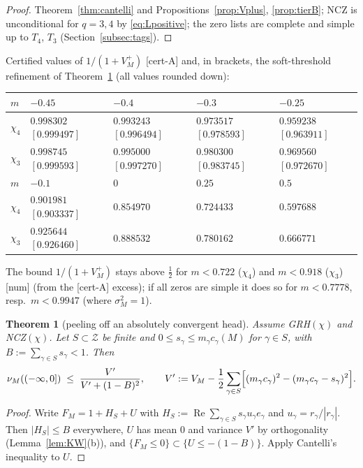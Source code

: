 \documentclass[11pt]{amsart}
\newtheorem{theorem}{Theorem}[section]
\theoremstyle{definition}
\numberwithin{equation}{section}
\newcommand{\re}{\operatorname{Re}}
\newcommand{\cZ}{\mathcal Z}          %
\newcommand{\certA}{\textsf{[cert-A]}}
\newcommand{\numtag}{\textsf{[num]}}
\begin{document}
\begin{proof}
Theorem~\ref{thm:cantelli} and
Propositions~\ref{prop:Vplus}, \ref{prop:tierB}; NCZ is unconditional
for $q=3,4$ by \eqref{eq:Lpositive}; the zero lists are complete and
simple up to $T_4$, $T_3$ (Section~\ref{subsec:tags}).
\end{proof}

Certified values of $1/(1+V_M^+)$ \certA{} and, in brackets, the
soft-threshold refinement of Theorem~\ref{thm:peel} (all values
rounded down):

\begin{center}
\small
\begin{tabular}{lllll}
\toprule
$m$ & $-0.45$ & $-0.4$ & $-0.3$ & $-0.25$\\
\midrule
$\chi_4$ & $0.998302$ $[0.999497]$ & $0.993243$ $[0.996494]$ &
$0.973517$ $[0.978593]$ & $0.959238$ $[0.963911]$\\
$\chi_3$ & $0.998745$ $[0.999593]$ & $0.995000$ $[0.997270]$ &
$0.980300$ $[0.983745]$ & $0.969560$ $[0.972670]$\\
\midrule
$m$ & $-0.1$ & $0$ & $0.25$ & $0.5$\\
\midrule
$\chi_4$ & $0.901981$ $[0.903337]$ & $0.854970$ & $0.724433$ &
$0.597688$\\
$\chi_3$ & $0.925644$ $[0.926460]$ & $0.888532$ & $0.780162$ &
$0.666771$\\
\bottomrule
\end{tabular}
\end{center}

\noindent The bound $1/(1+V_M^+)$ stays above $\tfrac12$ for
$m<0.722$ ($\chi_4$) and $m<0.918$ ($\chi_3$) \numtag{} (from the
\certA{} excess); if all zeros are simple it does so for $m<0.7778$,
resp.\ $m<0.9947$ (where $\sigma_M^2=1$).

\begin{theorem}[peeling off an absolutely convergent head]
\label{thm:peel}
Assume GRH$(\chi)$ and NCZ$(\chi)$. Let $S\subset\cZ$ be finite and
$0\le s_\gamma\le m_\gamma c_\gamma(M)$ for $\gamma\in S$, with
$B:=\sum_{\gamma\in S}s_\gamma<1$. Then
\[
\nu_M((-\infty,0])\;\le\;\frac{V'}{V'+(1-B)^2},
\qquad
V':=V_M-\frac12\sum_{\gamma\in S}\Bigl[(m_\gamma c_\gamma)^2
-(m_\gamma c_\gamma-s_\gamma)^2\Bigr].
\]
\end{theorem}

\begin{proof}
Write $F_M=1+H_S+U$ with
$H_S:=\re\sum_{\gamma\in S}s_\gamma u_\gamma e_\gamma$ and
$u_\gamma=r_\gamma/|r_\gamma|$. Then $|H_S|\le B$ everywhere, $U$ has
mean $0$ and variance $V'$ by orthogonality
(Lemma~\ref{lem:KW}(b)), and $\{F_M\le0\}\subset\{U\le-(1-B)\}$.
Apply Cantelli's inequality to $U$.
\end{proof}
\end{document}
